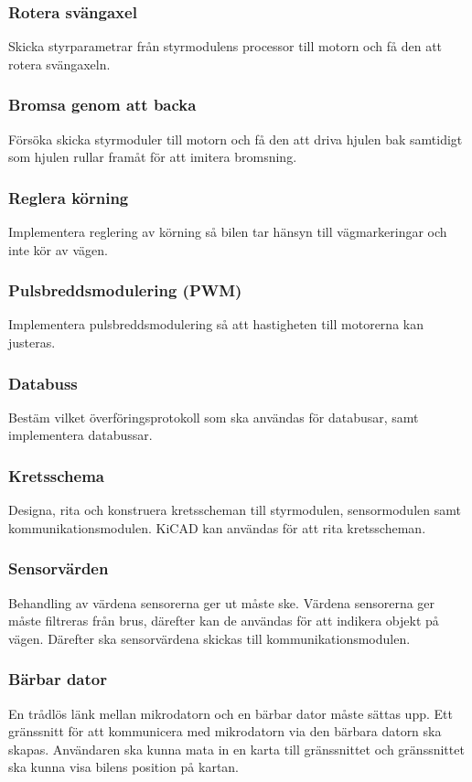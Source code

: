 \documentclass[projektplan/plan.tex]{subfiles}
\begin{document}
\subsubsection*{Rotera svängaxel}
Skicka styrparametrar från styrmodulens processor till motorn och få den att
rotera svängaxeln.
\subsubsection*{Bromsa genom att backa}
Försöka skicka styrmoduler till motorn och få den att driva hjulen bak
samtidigt som hjulen rullar framåt för att imitera bromsning.
\subsubsection*{Reglera körning}
Implementera reglering av körning så bilen tar hänsyn till vägmarkeringar och
inte kör av vägen.
\subsubsection*{Pulsbreddsmodulering (PWM)}
Implementera pulsbreddsmodulering så att hastigheten till motorerna kan
justeras.
\subsubsection*{Databuss}
Bestäm vilket överföringsprotokoll som ska användas för databusar, samt
implementera databussar.
\subsubsection*{Kretsschema}
Designa, rita och konstruera kretsscheman till styrmodulen, sensormodulen samt
kommunikationsmodulen. KiCAD kan användas för att rita kretsscheman.
\subsubsection*{Sensorvärden}
Behandling av värdena sensorerna ger ut måste ske. Värdena sensorerna ger måste
filtreras från brus, därefter kan de användas för att indikera objekt på vägen.
Därefter ska sensorvärdena skickas till kommunikationsmodulen.
\subsubsection*{Bärbar dator}
En trådlös länk mellan mikrodatorn och en bärbar dator måste sättas upp. Ett
gränssnitt för att kommunicera med mikrodatorn via den bärbara datorn ska
skapas. Användaren ska kunna mata in en karta till gränssnittet och
gränssnittet ska kunna visa bilens position på kartan.
\end{document}
